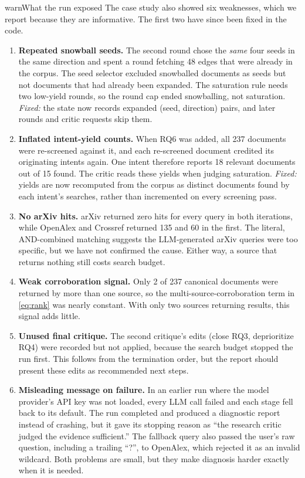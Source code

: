 \documentclass{article}
\begin{document}
\begin{callout}{warn}{What the run exposed}
The case study also showed six
weaknesses, which we report because they are informative. The first two
have since been fixed in the code.
\begin{enumerate}[leftmargin=*]
  \item \textbf{Repeated snowball seeds.} The second round chose the
    \emph{same} four seeds in the same direction and spent a round
    fetching 48 edges that were already in the corpus. The seed selector
    excluded snowballed documents as seeds but not documents that had
    already been expanded. The saturation rule needs two low-yield rounds,
    so the round cap ended snowballing, not saturation. \emph{Fixed:} the
    state now records expanded (seed, direction) pairs, and later rounds
    and critic requests skip them.
  \item \textbf{Inflated intent-yield counts.} When RQ6 was added, all 237
    documents were re-screened against it, and each re-screened document
    credited its originating intents again. One intent therefore reports
    18 relevant documents out of 15 found. The critic reads these yields
    when judging saturation. \emph{Fixed:} yields are now recomputed from
    the corpus as distinct documents found by each intent's searches,
    rather than incremented on every screening pass.
  \item \textbf{No arXiv hits.} arXiv returned zero hits for every query
    in both iterations, while OpenAlex and Crossref returned 135 and 60 in
    the first. The literal, AND-combined matching suggests the
    LLM-generated arXiv queries were too specific, but we have not
    confirmed the cause. Either way, a source that returns nothing still
    costs search budget.
  \item \textbf{Weak corroboration signal.} Only 2 of 237 canonical
    documents were returned by more than one source, so the
    multi-source-corroboration term in \cref{eq:rank} was nearly constant.
    With only two sources returning results, this signal adds little.
  \item \textbf{Unused final critique.} The second critique's edits (close
    RQ3, deprioritize RQ4) were recorded but not applied, because the
    search budget stopped the run first. This follows from the termination
    order, but the report should present these edits as recommended next
    steps.
  \item \textbf{Misleading message on failure.} In an earlier run where the
    model provider's API key was not loaded, every LLM call failed and each
    stage fell back to its default. The run completed and produced a
    diagnostic report instead of crashing, but it gave its stopping reason
    as ``the research critic judged the evidence sufficient.'' The fallback
    query also passed the user's raw question, including a trailing
    ``?'', to OpenAlex, which rejected it as an invalid wildcard. Both
    problems are small, but they make diagnosis harder exactly when it is
    needed.
\end{enumerate}
\end{callout}
\end{document}
